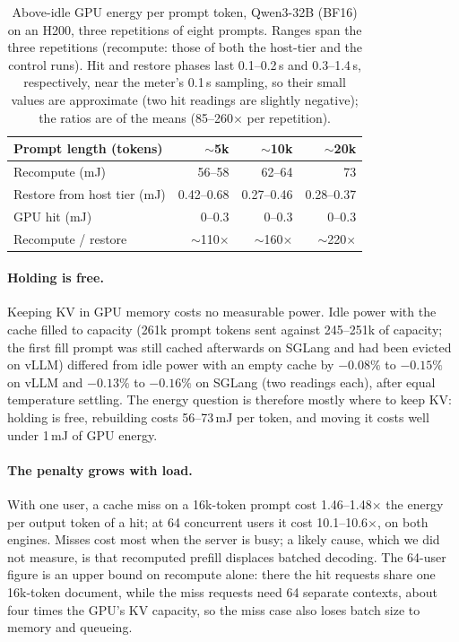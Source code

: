 \begin{table}[t]
\centering\small
\caption{Above-idle GPU energy per prompt token, Qwen3-32B (BF16) on an H200, three repetitions of eight prompts. Ranges span the three repetitions (recompute: those of both the host-tier and the control runs). Hit and restore phases last 0.1--0.2\,s and
0.3--1.4\,s, respectively, near the meter's 0.1\,s sampling, so their small values are approximate (two hit readings are slightly
negative); the ratios are of the means (85--260$\times$ per repetition).}
\label{tab:cost}
\begin{tabular}{lrrr}
\toprule
Prompt length (tokens) & $\sim$5k & $\sim$10k & $\sim$20k \\
\midrule
Recompute (mJ) & 56--58 & 62--64 & 73 \\
Restore from host tier (mJ) & 0.42--0.68 & 0.27--0.46 & 0.28--0.37 \\
GPU hit (mJ) & 0--0.3 & 0--0.3 & 0--0.3 \\
Recompute / restore & $\sim$110$\times$ & $\sim$160$\times$ & $\sim$220$\times$ \\
\bottomrule
\end{tabular}
\end{table}

\paragraph{Holding is free.} Keeping KV in GPU memory costs no measurable power. Idle power with the cache filled to
capacity (261k prompt tokens sent against 245--251k of capacity; the first fill prompt was still cached afterwards on
SGLang and had been evicted on vLLM) differed from idle power with an empty cache by
$-0.08\%$ to $-0.15\%$ on vLLM and $-0.13\%$ to $-0.16\%$ on SGLang (two readings each), after equal temperature settling. The energy question is therefore mostly
where to keep KV: holding is free, rebuilding costs 56--73\,mJ per token, and moving it costs well under
1\,mJ of GPU energy.

\paragraph{The penalty grows with load.} With one user, a cache miss on a 16k-token prompt cost 1.46--1.48$\times$ the
energy per output token of a hit; at 64 concurrent users it cost 10.1--10.6$\times$, on both engines. Misses cost most
when the server is busy; a likely cause, which we did not measure, is that recomputed prefill displaces batched
decoding. The 64-user figure is an upper bound on recompute alone: there the hit requests share
one 16k-token document, while the miss requests need 64 separate contexts, about four times the GPU's KV capacity, so
the miss case also loses batch size to memory and queueing.
